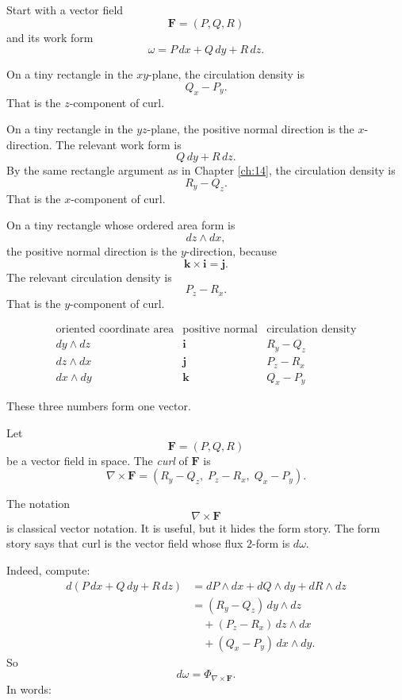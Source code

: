 Start with a vector field
\[
    \mathbf F=(P,Q,R)
\]
and its work form
\[
    \omega=P\,dx+Q\,dy+R\,dz.
\]

On a tiny rectangle in the \(xy\)-plane, the circulation density is
\[
    Q_x-P_y.
\]
That is the \(z\)-component of curl.

On a tiny rectangle in the \(yz\)-plane, the positive normal direction is the
\(x\)-direction.  The relevant work form is
\[
    Q\,dy+R\,dz.
\]
By the same rectangle argument as in Chapter \ref{ch:14}, the circulation density is
\[
    R_y-Q_z.
\]
That is the \(x\)-component of curl.

On a tiny rectangle whose ordered area form is
\[
    dz\wedge dx,
\]
the positive normal direction is the \(y\)-direction, because
\[
    \mathbf k\times \mathbf i=\mathbf j.
\]
The relevant circulation density is
\[
    P_z-R_x.
\]
That is the \(y\)-component of curl.

\[
\begin{array}{c|c|c}
\text{oriented coordinate area} & \text{positive normal} & \text{circulation density}\\ \hline
dy\wedge dz & \mathbf i & R_y-Q_z\\[1mm]
dz\wedge dx & \mathbf j & P_z-R_x\\[1mm]
dx\wedge dy & \mathbf k & Q_x-P_y
\end{array}
\]

These three numbers form one vector.

\begin{definition}[Curl]
Let
\[
    \mathbf F=(P,Q,R)
\]
be a vector field in space.  The \emph{curl} of \(\mathbf F\) is
\[
\boxed{
    \nabla\times \mathbf F
    =
    (R_y-Q_z,\;P_z-R_x,\;Q_x-P_y).
}
\]
\end{definition}

The notation
\[
    \nabla\times\mathbf F
\]
is classical vector notation.  It is useful, but it hides the form story.  The form story
says that curl is the vector field whose flux \(2\)-form is \(d\omega\).

Indeed, compute:
\[
\begin{aligned}
d(P\,dx+Q\,dy+R\,dz)
&=
dP\wedge dx+dQ\wedge dy+dR\wedge dz\\
&=
(R_y-Q_z)\,dy\wedge dz\\
&\quad+
(P_z-R_x)\,dz\wedge dx\\
&\quad+
(Q_x-P_y)\,dx\wedge dy.
\end{aligned}
\]
So
\[
\boxed{
    d\omega
    =
    \Phi_{\nabla\times\mathbf F}.
}
\]
In words:

